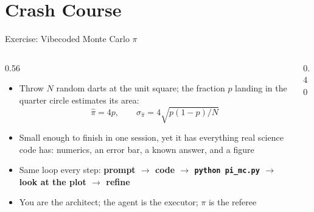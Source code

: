 \documentclass[10pt,aspectratio=169]{beamer}
\begin{document}
\section{Crash Course}

\begin{frame}{Exercise: Vibecoded Monte Carlo $\pi$}
  \begin{columns}[T]
    \begin{column}{0.56\textwidth}
      \begin{itemize}
        \item Throw $N$ random darts at the unit square; the fraction $p$
          landing in the quarter circle estimates its area:
          \[
            \hat\pi = 4p, \qquad
            \sigma_{\hat\pi} = 4\sqrt{p(1-p)/N}
          \]
        \item Small enough to finish in one session, yet it has everything
          real science code has: numerics, an error bar, a known answer,
          and a figure
        \item Same loop every step: \textbf{prompt $\rightarrow$ code
          $\rightarrow$ \texttt{python pi\_mc.py} $\rightarrow$ look at the
          plot $\rightarrow$ refine}
        \item You are the architect; the agent is the executor;
          $\pi$ is the referee
      \end{itemize}
    \end{column}
    \begin{column}{0.40\textwidth}
      \centering
    \end{column}
  \end{columns}
\end{frame}
\end{document}
